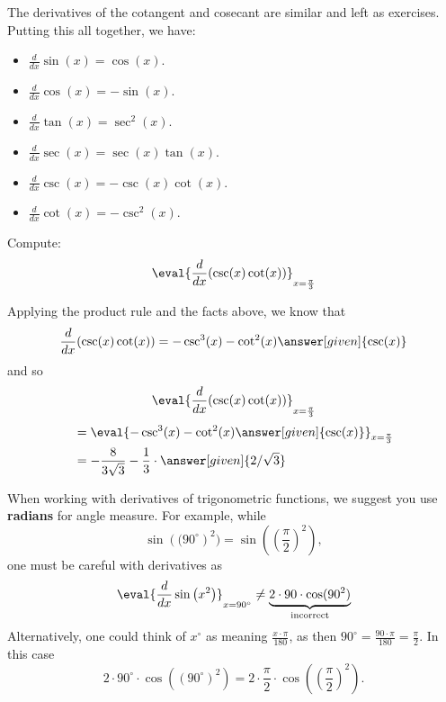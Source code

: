 \documentclass{ximera}
\begin{document}
The derivatives of the cotangent and cosecant are similar and left as
exercises.  Putting this all together, we have:

\begin{theorem} \hfil
\begin{itemize}
\item $\frac{d}{dx} \sin(x) = \cos(x)$.
\item $\frac{d}{dx} \cos(x) = -\sin(x)$.
\item $\frac{d}{dx} \tan(x) = \sec^2(x)$.
\item $\frac{d}{dx} \sec(x) = \sec(x)\tan(x)$.
\item $\frac{d}{dx} \csc(x) = -\csc(x)\cot(x)$.
\item $\frac{d}{dx} \cot(x) = -\csc^2(x)$.
\end{itemize}
\end{theorem}

\begin{example}
Compute:
\[
\eval{\frac{d}{dx} ( \csc(x) \cot(x) )}_{x=\frac{\pi}{3}}
\]
\begin{explanation}
Applying the product rule and the facts above, we know that
\[
\frac{d}{dx} ( \csc(x) \cot(x) ) = - \csc^3(x) - \cot^2(x)\answer[given]{\csc(x)}
\]
and so
\[
\eval{\frac{d}{dx} ( \csc(x) \cot(x) )}_{x=\frac{\pi}{3}}
\]
\begin{align*}
  &= \eval{  - \csc^3(x) - \cot^2(x) \answer[given]{\csc(x)}}_{x=\frac{\pi}{3}}  \\
&= - \frac{8}{3 \sqrt{3}} - \frac{1}{3}\cdot \answer[given]{2/\sqrt{3}}
\end{align*}
\end{explanation}
\end{example}


\begin{warning}
When working with derivatives of trigonometric functions, we suggest
you use \textbf{radians} for angle measure. For example, while
\[
\sin\left((90^\circ\right)^2) = \sin\left(\left(\frac{\pi}{2}\right)^2\right),
\]
one must be careful with derivatives as
\[
\eval{\frac{d}{dx} \sin\left(x^2\right)}_{x=90^\circ} \ne \underbrace{2\cdot 90\cdot \cos(90^2)}_{\text{incorrect}}
\]
Alternatively, one could think of $x^\circ$ as meaning
$\frac{x\cdot\pi}{180}$, as then $90^\circ = \frac{90\cdot\pi}{180} =
\frac{\pi}{2}$. In this case
\[
2\cdot 90^\circ\cdot \cos((90^\circ)^2) = 2\cdot \frac{\pi}{2}\cdot\cos\left(\left(\frac{\pi}{2}\right)^2\right).
\]
\end{warning}
\end{document}
